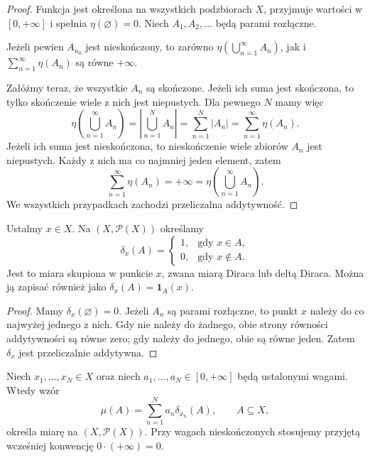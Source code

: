 \begin{proof}
Funkcja jest określona na wszystkich podzbiorach $X$, przyjmuje wartości
w $[0,+\infty]$ i spełnia $\eta(\varnothing)=0$.
Niech $A_1,A_2,\ldots$ będą parami rozłączne.

Jeżeli pewien $A_{n_0}$ jest nieskończony, to zarówno
$\eta(\bigcup_{n=1}^{\infty}A_n)$, jak i
$\sum_{n=1}^{\infty}\eta(A_n)$ są równe $+\infty$.

Załóżmy teraz, że wszystkie $A_n$ są skończone.
Jeżeli ich suma jest skończona, to tylko skończenie wiele z nich
jest niepustych. Dla pewnego $N$ mamy więc
\[
  \eta\left(\bigcup_{n=1}^{\infty}A_n\right)
  =\left|\bigcup_{n=1}^{N}A_n\right|
  =\sum_{n=1}^{N}|A_n|
  =\sum_{n=1}^{\infty}\eta(A_n).
\]
Jeżeli ich suma jest nieskończona, to nieskończenie wiele zbiorów $A_n$
jest niepustych. Każdy z nich ma co najmniej jeden element, zatem
\[
  \sum_{n=1}^{\infty}\eta(A_n)=+\infty
  =\eta\left(\bigcup_{n=1}^{\infty}A_n\right).
\]
We wszystkich przypadkach zachodzi przeliczalna addytywność.
\end{proof}

\begin{przyklad}
\label{prz:dirac}
Ustalmy $x\in X$. Na $(X,\mathcal{P}(X))$ określamy
\begin{equation}
  \delta_x(A)=
  \begin{cases}
    1, & \text{gdy }x\in A,\\
    0, & \text{gdy }x\notin A.
  \end{cases}
  \label{eq:dirac}
\end{equation}
Jest to miara skupiona w punkcie $x$, zwana miarą Diraca
lub deltą Diraca. Można ją zapisać również jako $\delta_x(A)=\mathbf{1}_A(x)$.
\end{przyklad}

\begin{proof}
Mamy $\delta_x(\varnothing)=0$.
Jeżeli $A_n$ są parami rozłączne, to punkt $x$ należy do co najwyżej
jednego z nich. Gdy nie należy do żadnego, obie strony równości
addytywności są równe zero; gdy należy do jednego, obie są równe jeden.
Zatem $\delta_x$ jest przeliczalnie addytywna.
\end{proof}

\begin{przyklad}
\label{prz:skonczony-nosnik}
Niech $x_1,\ldots,x_N\in X$ oraz niech $a_1,\ldots,a_N\in[0,+\infty]$
będą ustalonymi wagami. Wtedy wzór
\begin{equation}
  \mu(A)=\sum_{n=1}^{N}a_n\delta_{x_n}(A),
  \qquad A\subseteq X,
  \label{eq:miara-skonczony-nosnik}
\end{equation}
określa miarę na $(X,\mathcal{P}(X))$.
Przy wagach nieskończonych stosujemy przyjętą wcześniej konwencję
$0\cdot(+\infty)=0$.
\end{przyklad}


